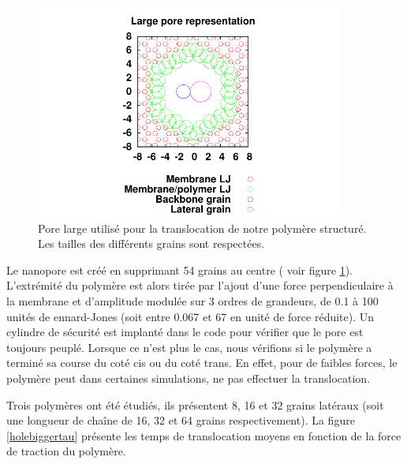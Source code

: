 \documentclass[a4paper,11pt]{article}
\begin{document}
\begin{figure}[H]
\begin{center}
\includegraphics[width=0.9\textwidth]{largepore.pdf}


\caption{Pore large utilisé pour la translocation de notre polymère structuré. Les tailles des différents grains sont respectées. }
\label{porelarge}
\end{center}
\end{figure}

  Le nanopore est créé en supprimant 54 grains au centre ( voir figure \ref{porelarge}). L'extrémité du polymère est alors tirée par l'ajout d'une force perpendiculaire à la membrane et d'amplitude modulée sur 3 ordres de grandeurs, de 0.1 à 100 unités de ennard-Jones (soit entre 0.067 et 67 en unité de force réduite). Un cylindre de sécurité est implanté dans le code pour vérifier que le pore est toujours peuplé. Lorsque ce n'est plus le cas, nous vérifions si le polymère a terminé sa course du coté cis ou du coté trans. En effet, pour de faibles forces, le polymère peut dans certaines simulations, ne pas effectuer la translocation.




Trois polymères ont été étudiés, ils présentent 8, 16 et 32 grains latéraux (soit une longueur de cha\^ine de 16, 32 et 64 grains respectivement). La figure \ref{holebiggertau} présente les temps de translocation moyens en fonction de la force de traction du polymère.
\end{document}
